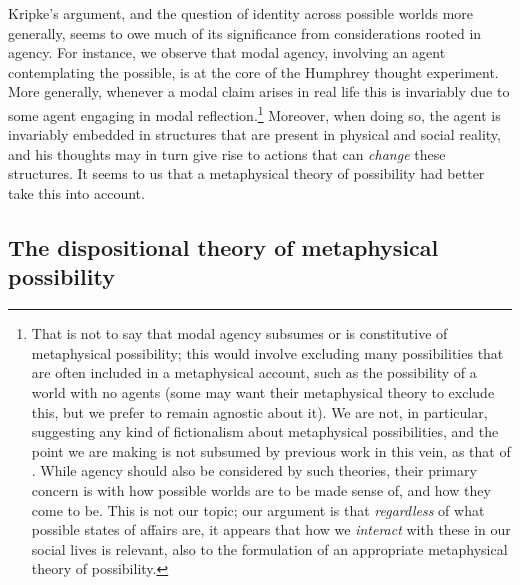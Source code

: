 \documentclass{article}
\begin{document}
Kripke's argument, and the question of identity across possible worlds more generally, seems to owe much of its significance from considerations rooted in agency. For instance, we observe that modal agency, involving an agent contemplating the possible, is at the core of the Humphrey thought experiment. More generally, whenever a modal claim arises in real life this is invariably due to some agent engaging in modal reflection.\footnote{That is not to say that modal agency subsumes or is constitutive of metaphysical possibility; this would involve excluding many possibilities that are often included in a metaphysical account, such as the possibility of a world with no agents (some may want their metaphysical theory to exclude this, but we prefer to remain agnostic about it). We are not, in particular, suggesting any kind of fictionalism about metaphysical possibilities, and the point we are making is not subsumed by previous work in this vein, as that of \cite{ficr,ficrfix}. While agency should also be considered by such theories, their primary concern is with how possible worlds are to be made sense of, and how they come to be. This is not our topic; our argument is that \emph{regardless} of what possible states of affairs are, it appears that how we \emph{interact} 
with these in our social lives is relevant, also to the formulation of an appropriate metaphysical theory of possibility.} Moreover, when doing so, the agent is invariably embedded in structures that are present in physical and social reality, and his thoughts may in turn give rise to actions that can \emph{change} these structures. It seems to us that a metaphysical theory of possibility had better take this into account.

\subsection*{The dispositional theory of metaphysical possibility}
\end{document}
